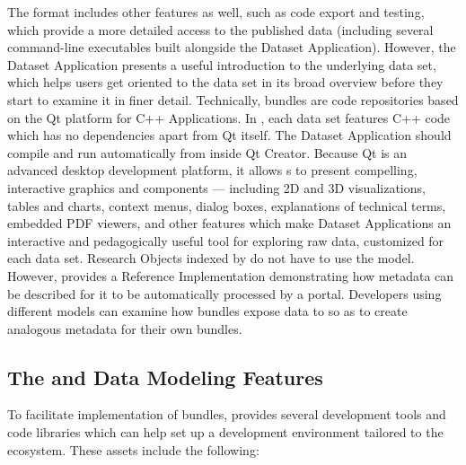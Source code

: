 \documentclass[10pt,letterpaper]{article}
\begin{document}
\p{}
The {\RAK} format includes other 
features as well, such as code export and testing, 
which provide a more detailed access to 
the published data (including several command-line 
executables built alongside the Dataset Application).  
However, the Dataset Application 
presents a useful introduction to the underlying 
data set, which helps users get oriented to the data set 
in its broad overview before they start to examine it in 
finer detail.
\p{}
Technically, {\MOSAIC} {\RAK} bundles are code repositories 
based on the Qt platform for C++ Applications.  
In {\RAK}, each data set features C++ code which has no 
dependencies apart from Qt itself.  The Dataset 
Application should compile and run automatically from 
inside Qt Creator.  Because Qt is an advanced 
desktop {\GUI} development platform, it allows 
{\RO}s to present compelling, 
interactive graphics and {\GUI} components 
--- including 2D and 3D visualizations, tables and charts, 
context menus, dialog boxes, explanations of 
technical terms, embedded PDF viewers, and other 
features which make Dataset Applications an 
interactive and pedagogically useful tool for 
exploring raw data, customized for each data set.
\p{}  
Research Objects indexed by {\MOSAIC} do not have to 
use the {\RAK} model.  However, {\RAK} provides a 
Reference Implementation demonstrating how {\RO} 
metadata can be described for it to be automatically 
processed by a {\MOSAIC} portal.  Developers 
using different {\RO} models can 
examine how {\RAK} bundles expose data to {\MOSAIC} 
so as to create analogous metadata for their own 
bundles.
\p{}
\subsection{The {\lMOSAIC} {\lSDK} and Data Modeling Features}
To facilitate implementation of {\RAK} bundles, 
{\MOSAIC} provides several development tools and 
code libraries which can help set up a development 
environment tailored to the {\MOSAIC} ecosystem.  
These assets include the following: 
\end{document}
